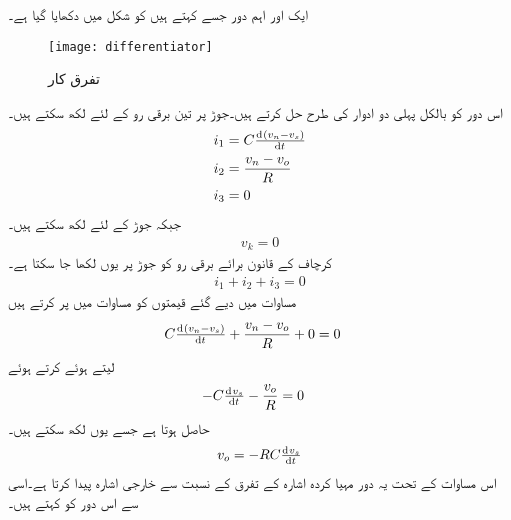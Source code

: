 ایک اور اہم دور جسے   کہتے ہیں کو شکل  میں دکھایا گیا ہے۔
\begin{figure}
\centering
\texttt{[image: differentiator]}
\caption{تفرق کار}
\label{شکل_تفرق_کار}
\end{figure}
	اس دور کو بالکل پہلی دو ادوار کی طرح حل کرتے ہیں۔جوڑ پر تین برقی رو کے لئے لکھ سکتے ہیں۔
\begin{align} \label{مساوات_تفرق_کار_کے_مساوات_کا_حصول}
i_1 &= C \od{\left (v_n-v_s \right )}{t} \nonumber \\
i_2 &=\frac{v_n-v_o}{R} \nonumber \\
i_3 &=0
\end{align}
جبکہ جوڑ  کے لئے لکھ سکتے ہیں۔
\begin{align}
v_k=0
\end{align}
کرچاف کے قانون برائے برقی رو کو جوڑ  پر یوں لکھا جا سکتا ہے۔
\begin{align} \label{مساوات_تفرق_کار_داخلی_جوڑ_پر_رو}
i_1+i_2+i_3=0
\end{align}
مساوات  میں دیے گئے قیمتوں کو مساوات   میں پر کرتے ہیں
\begin{align*}
C \od{\left(v_n-v_s\right)}{t}+\frac{v_n-v_o}{R}+0&=0
\end{align*}
 لیتے ہوئے   کرتے ہوئے
\begin{align*}
 -C \od{v_s}{t}-\frac{v_o}{R}&=0
\end{align*}
حاصل ہوتا ہے جسے یوں لکھ سکتے ہیں۔
\begin{align}
v_o = -RC \od{v_s}{t}
\end{align}
اس مساوات کے تحت یہ دور مہیا کردہ اشارہ  کے تفرق کے نسبت سے خارجی اشارہ  پیدا کرتا ہے۔اسی سے اس دور کو   کہتے ہیں۔



